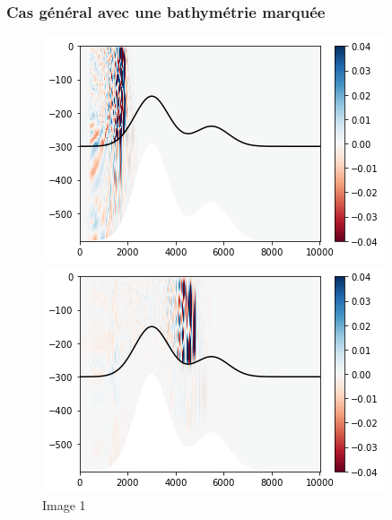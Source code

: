 \documentclass{rapportECC}
\begin{document}
\subsubsection{Cas général avec une bathymétrie marquée}

\begin{figure}[H] %
    \centering
    \begin{minipage}{0.45\textwidth}
        \centering
        \includegraphics[width=\linewidth]{images/im2.png}
        \caption{Image 1}
        \label{fig:image1}
    \end{minipage}
    \hspace{0.05\textwidth} %
    \begin{minipage}{0.45\textwidth}
        \centering
        \includegraphics[width=\linewidth]{images/im4.png}

\end{minipage}
\end{figure}
\end{document}
